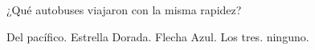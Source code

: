 ¿Qué autobuses viajaron con la misma rapidez?

\begin{checkboxes}
    \choice Del pacífico.
    \CorrectChoice Estrella Dorada.
    \CorrectChoice Flecha Azul.
    \choice Los tres.
    \choice ninguno.
\end{checkboxes}